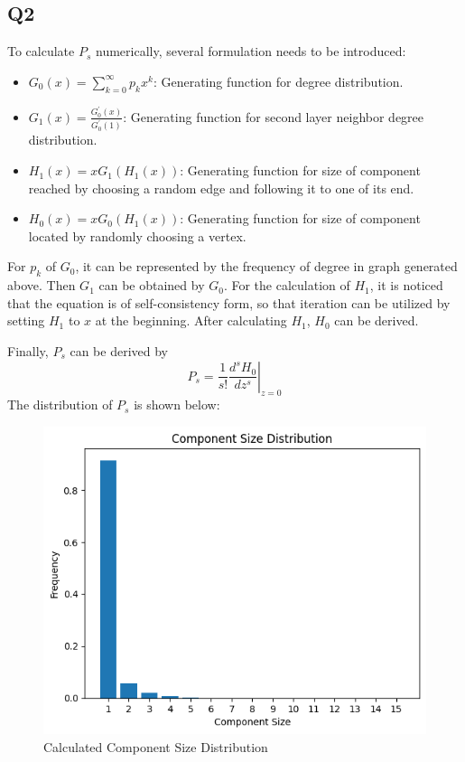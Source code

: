 \documentclass{article}
\begin{document}
	\subsection*{Q2}
	To calculate $P_s$ numerically, several formulation needs to be introduced:
	\begin{itemize}
		\item $G_0(x) = \sum_{k=0}^{\infty}p_k x^k$: Generating function for degree distribution.
		\item $G_1(x) = \frac{G^{\prime}_0(x)}{G^{\prime}_0(1)}$: Generating function for second layer neighbor degree distribution.
		\item $H_1(x) = x G_1(H_1(x))$: Generating function for size of component reached by choosing a random edge and following it to one of its end.
		\item $H_0(x) = xG_0(H_1(x))$: Generating function for size of component located by randomly choosing a vertex.
	\end{itemize}
	For $p_k$ of $G_0$, it can be represented by the frequency of degree in graph generated above. Then $G_1$ can be obtained by $G_0$. For the calculation of $H_1$, it is noticed that the equation is of self-consistency form, so that iteration can be utilized by setting $H_1$ to $x$ at the beginning. After calculating $H_1$, $H_0$ can be derived.
	
	Finally, $P_s$ can be derived by $$P_s = \left. \frac{1}{s!}\frac{d^s H_0}{d z^s} \right|_{z=0}$$
	The distribution of $P_s$ is shown below:
	\begin{figure}[H]
		\centering
		\includegraphics[scale=0.5]{P1Q2.png}
		\caption{Calculated Component Size Distribution}
	\end{figure}
	
\end{document}
